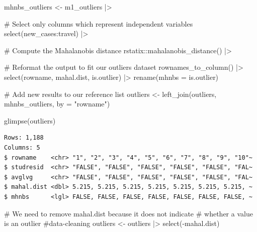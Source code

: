 \documentclass[
  letterpaper,
]{krantz}
\makeatletter
\newenvironment{Shaded}{\begin{snugshade}}{\end{snugshade}}
\newcommand{\AttributeTok}[1]{\textcolor[rgb]{0.40,0.45,0.13}{#1}}
\newcommand{\CommentTok}[1]{\textcolor[rgb]{0.37,0.37,0.37}{#1}}
\newcommand{\FunctionTok}[1]{\textcolor[rgb]{0.28,0.35,0.67}{#1}}
\newcommand{\NormalTok}[1]{\textcolor[rgb]{0.00,0.23,0.31}{#1}}
\newcommand{\OtherTok}[1]{\textcolor[rgb]{0.00,0.23,0.31}{#1}}
\newcommand{\SpecialCharTok}[1]{\textcolor[rgb]{0.37,0.37,0.37}{#1}}
\newcommand{\StringTok}[1]{\textcolor[rgb]{0.13,0.47,0.30}{#1}}
\newenvironment{kframe}{%
\medskip{}
\setlength{\fboxsep}{.8em}
 \def\at@end@of@kframe{}%
 \ifinner\ifhmode%
  \def\at@end@of@kframe{\end{minipage}}%
  \begin{minipage}{\columnwidth}%
 \fi\fi%
 \def\FrameCommand##1{\hskip\@totalleftmargin \hskip-\fboxsep
 \colorbox{shadecolor}{##1}\hskip-\fboxsep
     \hskip-\linewidth \hskip-\@totalleftmargin \hskip\columnwidth}%
 \MakeFramed {\advance\hsize-\width
   \@totalleftmargin\z@ \linewidth\hsize
   \@setminipage}}%
 {\par\unskip\endMakeFramed%
 \at@end@of@kframe}
\renewenvironment{Shaded}{\begin{kframe}}{\end{kframe}}
\makeatother
\begin{document}
\begin{Shaded}
\begin{Highlighting}[]
\NormalTok{mhnbs\_outliers }\OtherTok{\textless{}{-}}
\NormalTok{  m1\_outliers }\SpecialCharTok{|\textgreater{}}
  
  \CommentTok{\# Select only columns which represent independent variables}
  \FunctionTok{select}\NormalTok{(new\_cases}\SpecialCharTok{:}\NormalTok{travel) }\SpecialCharTok{|\textgreater{}}
  
  \CommentTok{\# Compute the Mahalanobis distance}
\NormalTok{  rstatix}\SpecialCharTok{::}\FunctionTok{mahalanobis\_distance}\NormalTok{() }\SpecialCharTok{|\textgreater{}}
  
  \CommentTok{\# Reformat the output to fit our \textquotesingle{}outliers\textquotesingle{} dataset}
  \FunctionTok{rownames\_to\_column}\NormalTok{() }\SpecialCharTok{|\textgreater{}}
  \FunctionTok{select}\NormalTok{(rowname, mahal.dist, is.outlier) }\SpecialCharTok{|\textgreater{}}
  \FunctionTok{rename}\NormalTok{(}\AttributeTok{mhnbs =}\NormalTok{ is.outlier)}

\CommentTok{\# Add new results to our reference list}
\NormalTok{outliers }\OtherTok{\textless{}{-}} \FunctionTok{left\_join}\NormalTok{(outliers, mhnbs\_outliers, }\AttributeTok{by =} \StringTok{"rowname"}\NormalTok{)}

\FunctionTok{glimpse}\NormalTok{(outliers)}
\end{Highlighting}
\end{Shaded}

\begin{verbatim}
Rows: 1,188
Columns: 5
$ rowname    <chr> "1", "2", "3", "4", "5", "6", "7", "8", "9", "10"~
$ studresid  <chr> "FALSE", "FALSE", "FALSE", "FALSE", "FALSE", "FAL~
$ avglvg     <chr> "FALSE", "FALSE", "FALSE", "FALSE", "FALSE", "FAL~
$ mahal.dist <dbl> 5.215, 5.215, 5.215, 5.215, 5.215, 5.215, 5.215, ~
$ mhnbs      <lgl> FALSE, FALSE, FALSE, FALSE, FALSE, FALSE, FALSE, ~
\end{verbatim}

\begin{Shaded}
\begin{Highlighting}[]
\CommentTok{\# We need to remove mahal.dist because it does not indicate}
\CommentTok{\# whether a value is an outlier \#data{-}cleaning}
\NormalTok{outliers }\OtherTok{\textless{}{-}}\NormalTok{ outliers }\SpecialCharTok{|\textgreater{}} \FunctionTok{select}\NormalTok{(}\SpecialCharTok{{-}}\NormalTok{mahal.dist)}
\end{Highlighting}
\end{Shaded}
\end{document}
